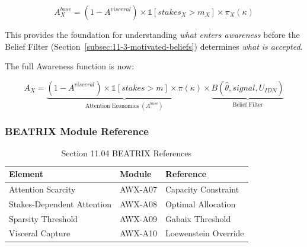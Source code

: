 \begin{equation}
\boxed{
A^{base}_X = (1 - A^{visceral}) \times \mathbb{1}[stakes_X > m_X] \times \pi_X(\kappa)
}
\end{equation}

This provides the foundation for understanding \emph{what enters awareness} 
before the Belief Filter (Section~\ref{subsec:11-3-motivated-beliefs}) 
determines \emph{what is accepted}.

The full Awareness function is now:

\begin{equation}
\boxed{
A_X = \underbrace{(1 - A^{visceral}) \times \mathbb{1}[stakes > m] \times \pi(\kappa)}_{\text{Attention Economics } (A^{base})} \times \underbrace{B(\hat{\theta}, signal, U_{IDN})}_{\text{Belief Filter}}
}
\end{equation}

\subsubsection{BEATRIX Module Reference}
\label{subsubsec:beatrix-ref}

\begin{table}[htbp]
\centering
\caption{Section 11.04 BEATRIX References}
\label{tab:11-4-beatrix}
\renewcommand{\arraystretch}{1.3}
\begin{tabular}{@{}lll@{}}
\toprule
\textbf{Element} & \textbf{Module} & \textbf{Reference} \\
\midrule
Attention Scarcity & AWX-A07 & Capacity Constraint \\
Stakes-Dependent Attention & AWX-A08 & Optimal Allocation \\
Sparsity Threshold & AWX-A09 & Gabaix Threshold \\
Visceral Capture & AWX-A10 & Loewenstein Override \\
\bottomrule
\end{tabular}
\end{table}

